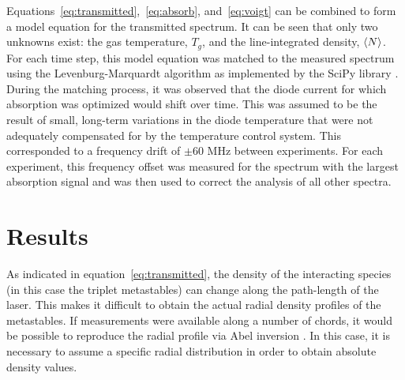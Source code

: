 Equations~\ref{eq:transmitted},~\ref{eq:absorb}, and~\ref{eq:voigt} can be
combined to form a model equation for the transmitted spectrum. It can be seen
that only two unknowns exist: the gas temperature, $T_g$, and the
line-integrated density, $\langle N \rangle$. For each time step, this model equation was
matched to the measured spectrum using the Levenburg-Marquardt algorithm
\cite{Marquardt1963} as implemented by the SciPy library \cite{Jones2001}.
During the matching process, it was observed that the diode current for which
absorption was optimized would shift over time. This was assumed to be the
result of small, long-term variations in the diode temperature that were not
adequately compensated for by the temperature control system. This corresponded
to a frequency drift of $\pm60$ MHz between experiments. For each experiment,
this frequency offset was measured for the spectrum with the largest absorption
signal and was then used to correct the analysis of all other spectra.

\section{Results}




As indicated in equation~\ref{eq:transmitted}, the density of the interacting
species (in this case the triplet metastables) can change along the path-length
of the laser. This makes it difficult to obtain the actual radial density
profiles of the metastables. If measurements were available along a number of
chords, it would be possible to reproduce the radial profile via Abel inversion
\cite{Hutchison2005}. In this case, it is necessary to assume a specific radial
distribution in order to obtain absolute density values. 
